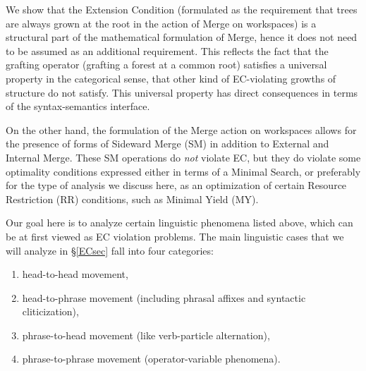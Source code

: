 \documentclass[12pt]{amsart}
\numberwithin{equation}{section}
\begin{document}
\smallskip

We show that the Extension Condition (formulated as the requirement that trees
are always grown at the root in the action of Merge on workspaces) is a structural 
part of the mathematical formulation of Merge, hence it does not need to be assumed 
as an additional requirement. This reflects the fact that the grafting operator (grafting
a forest at a common root) satisfies a universal property in the categorical sense, that
other kind of EC-violating growths of structure do not satisfy. This universal property has 
direct consequences in terms of the syntax-semantics interface. 

\smallskip

On the other hand, the formulation of the Merge action on workspaces 
allows for the presence of forms of Sideward Merge (SM) in addition to External and Internal
Merge. These SM operations do {\em not} violate EC,
but they do violate some optimality conditions expressed either in terms of a 
Minimal Search, or preferably for the type of analysis we discuss here, as an
optimization of certain Resource Restriction (RR) conditions, such as Minimal Yield (MY).

\smallskip

Our goal here is to analyze certain linguistic phenomena listed above, which
can be at first viewed as EC violation problems. The main linguistic cases that we 
will analyze in \S \ref{ECsec} fall into four categories:
\begin{enumerate}
\item head-to-head movement,
\item head-to-phrase movement (including phrasal affixes and syntactic cliticization),
\item phrase-to-head movement (like verb-particle alternation),
\item phrase-to-phrase movement (operator-variable phenomena).
\end{enumerate}

\smallskip
\end{document}
